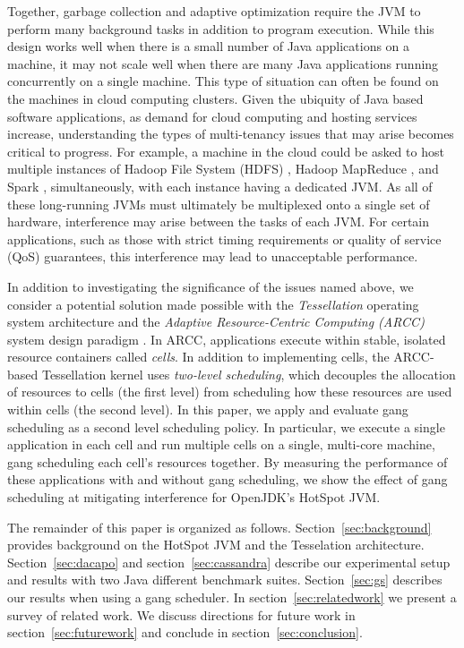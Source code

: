 \documentclass{sig-alternate}
\begin{document}
Together, garbage collection and adaptive optimization require the JVM to perform many background tasks in addition to program execution. While this design works well when there is a small number of Java applications on a machine, it may not scale well when there are many Java applications running concurrently on a single machine. This type of situation can often be found on the machines in cloud computing clusters. Given the ubiquity of Java based software applications, as demand for cloud computing and hosting services increase, understanding the types of multi-tenancy issues that may arise becomes critical to progress. For example, a machine in the cloud could be asked to host multiple instances of Hadoop File System (HDFS) \cite{shvachko2010hadoop}, Hadoop MapReduce \cite{bialecki2005hadoop}, and Spark \cite{zaharia2010spark}, simultaneously, with each instance having a dedicated JVM. As all of these long-running JVMs must ultimately be multiplexed onto a single set of hardware, interference may arise between the tasks of each JVM. For certain applications, such as those with strict timing requirements or quality of service (QoS) guarantees, this interference may lead to unacceptable performance.

In addition to investigating the significance of the issues named above, we consider a potential solution made possible with the \textit{Tessellation} operating system architecture and the \textit{Adaptive Resource-Centric Computing (ARCC)} system design paradigm \cite{colmenares2010resource, colmenares2013tessellation, liu2009tessellation}. In ARCC, applications execute within stable, isolated resource containers called \textit{cells}. In addition to implementing cells, the ARCC-based Tessellation kernel uses \textit{two-level scheduling}, which decouples the allocation of resources to cells (the first level) from scheduling how these resources are used within cells (the second level). In this paper, we apply and evaluate gang scheduling \cite{feitelson1992gang} as a second level scheduling policy. In particular, we execute a single application in each cell and run multiple cells on a single, multi-core machine, gang scheduling each cell's resources together. By measuring the performance of these applications with and without gang scheduling, we show the effect of gang scheduling at mitigating interference for OpenJDK's HotSpot JVM.

The remainder of this paper is organized as follows. Section~\ref{sec:background} provides background on the HotSpot JVM and the Tesselation architecture. Section~\ref{sec:dacapo} and section~\ref{sec:cassandra} describe our experimental setup and results with two Java different benchmark suites. Section~\ref{sec:gs} describes our results when using a gang scheduler. In section~\ref{sec:relatedwork} we present a survey of related work. We discuss directions for future work in section~\ref{sec:futurework} and conclude in section~\ref{sec:conclusion}.
\end{document}
